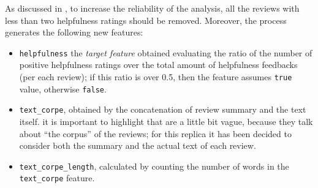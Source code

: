 \documentclass[a4paper]{article}
\begin{document}
		 	As discussed in \cite{article:muller}, to increase the reliability of the analysis, all the reviews with less than two helpfulness ratings should be removed. Moreover, the process generates the following new features:
		 	\begin{itemize}
		 		\item \verb*|helpfulness| the \emph{target feature} obtained evaluating the ratio of the number of positive helpfulness ratings over the total amount of helpfulness feedbacks (per each review); if this ratio is over 0.5, then the feature assumes \verb*|true| value, otherwise \verb*|false|.
		 		\item \verb*|text_corpe|, obtained by the concatenation of review summary and the text itself. it is important to highlight that \citeauthor{article:muller} are a little bit vague, because they talk about ``the corpus'' of the reviews; for this replica it has been decided to consider both the summary and the actual text of each review.
		 		\item \verb*|text_corpe_length|, calculated by counting the number of words in the \verb*|text_corpe| feature. 
		 	\end{itemize} 
	 	
\end{document}
